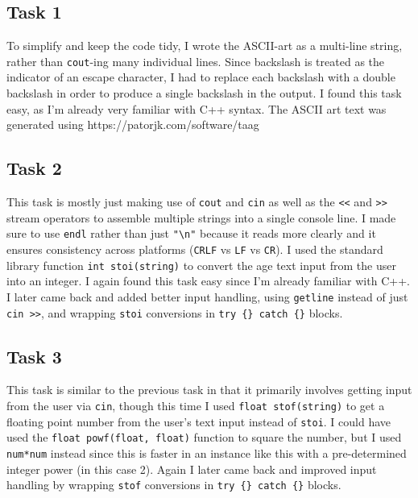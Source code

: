 \documentclass[
]{article}
\author{}
\date{}
\begin{document}
\subsection{Task 1}\label{task-1}

To simplify and keep the code tidy, I wrote the ASCII-art as a
multi-line string, rather than \texttt{cout}-ing many individual lines.
Since backslash is treated as the indicator of an escape character, I
had to replace each backslash with a double backslash in order to
produce a single backslash in the output. I found this task easy, as I'm
already very familiar with C++ syntax. The ASCII art text was generated
using https://patorjk.com/software/taag

\subsection{Task 2}\label{task-2}

This task is mostly just making use of \texttt{cout} and \texttt{cin} as
well as the \texttt{\textless{}\textless{}} and
\texttt{\textgreater{}\textgreater{}} stream operators to assemble
multiple strings into a single console line. I made sure to use
\texttt{endl} rather than just \texttt{"\textbackslash{}n"} because it
reads more clearly and it ensures consistency across platforms
(\texttt{CRLF} vs \texttt{LF} vs \texttt{CR}). I used the standard
library function \texttt{int\ stoi(string)} to convert the age text
input from the user into an integer. I again found this task easy since
I'm already familiar with C++. I later came back and added better input
handling, using \texttt{getline} instead of just
\texttt{cin\ \textgreater{}\textgreater{}}, and wrapping \texttt{stoi}
conversions in \texttt{try\ \{\}\ catch\ \{\}} blocks.

\subsection{Task 3}\label{task-3}

This task is similar to the previous task in that it primarily involves
getting input from the user via \texttt{cin}, though this time I used
\texttt{float\ stof(string)} to get a floating point number from the
user's text input instead of \texttt{stoi}. I could have used the
\texttt{float\ powf(float,\ float)} function to square the number, but I
used \texttt{num*num} instead since this is faster in an instance like
this with a pre-determined integer power (in this case 2). Again I later
came back and improved input handling by wrapping \texttt{stof}
conversions in \texttt{try\ \{\}\ catch\ \{\}} blocks.
\end{document}
